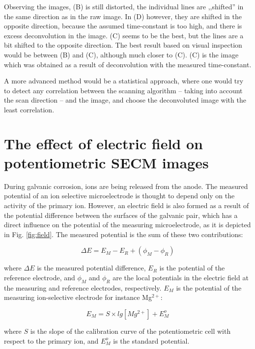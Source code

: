 Observing the images, (B) is still distorted, the individual lines are ,,shifted'' in the same direction as in the raw image.
In (D) however, they are shifted in the opposite direction, because the assumed time-constant is too high, and there is excess deconvolution in the image.
(C) seems to be the best, but the lines are a bit shifted to the opposite direction.
The best result based on visual inspection would be between (B) and (C), although much closer to (C).
(C) is the image which was obtained as a result of deconvolution with the measured time-constant.

A more advanced method would be a statistical approach, where one would try to detect any correlation between the scanning algorithm -- taking into account the scan direction -- and the image, and choose the deconvoluted image with the least correlation.



\newpage
\section{The effect of electric field on potentiometric SECM images}

During galvanic corrosion, ions are being released from the anode.
The measured potential of an ion selective microelectrode is thought to depend only on the activity of the primary ion.
However, an electric field is also formed as a result of the potential difference between the surfaces of the galvanic pair, which has a direct influence on the potential of the measuring microelectrode, as it is depicted in Fig. \ref{fig:field}. The measured potential is the sum of these two contributions:

\begin{equation}
\Delta E=E_M-E_R + (\phi_M - \phi_R)
\label{eq:potential}
\end{equation}

where $\Delta E$ is the measured potential difference, $E_R$ is the potential of the reference electrode, and $\phi_M$ and $\phi_R$ are the local potentials in the electric field at the measuring and reference electrodes, respectively. $E_M$ is the potential of the measuring ion-selective electrode for instance Mg$^{2+}$:

\begin{equation}
E_M = S \times lg[Mg^{2+}] + E_M^o
\label{eq:measuring}
\end{equation}

where $S$ is the slope of the calibration curve of the potentiometric cell with respect to the primary ion, and $E_M^o$ is the standard potential.

